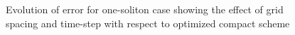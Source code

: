 \begin{figure}[h!]
{}
\caption{Evolution of error for one-soliton case showing the effect of grid spacing and time-step with respect to optimized compact scheme}
\label{fig:one1}
\end{figure}


\begin{figure}[h!]
\centerline{
}
\end{figure}
